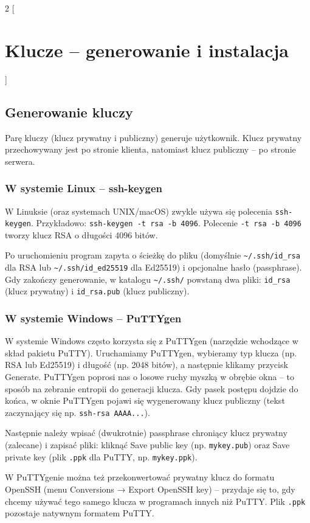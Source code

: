 \documentclass{article}
\begin{document}
\begin{multicols}{2}
[
\section{Klucze -- generowanie i instalacja}
]
\subsection{Generowanie kluczy}
Parę kluczy (klucz prywatny i publiczny) generuje użytkownik. Klucz prywatny przechowywany jest po stronie klienta, natomiast klucz publiczny -- po stronie serwera.

\subsubsection{W systemie Linux -- ssh-keygen}
W Linuksie (oraz systemach UNIX/macOS) zwykle używa się polecenia \verb|ssh-keygen|. Przykładowo:
\verb|ssh-keygen -t rsa -b 4096|. Polecenie \verb|-t rsa -b 4096| tworzy klucz RSA o długości 4096 bitów. 

Po uruchomieniu program zapyta o ścieżkę do pliku (domyślnie \verb|~/.ssh/id_rsa| dla RSA lub \verb|~/.ssh/id_ed25519| dla Ed25519) i opcjonalne hasło (passphrase). Gdy zakończy generowanie, w katalogu \verb|~/.ssh/| powstaną dwa pliki: \verb|id_rsa| (klucz prywatny) i \verb|id_rsa.pub| (klucz publiczny).

\subsubsection{W systemie Windows -- PuTTYgen}
W systemie Windows często korzysta się z PuTTYgen (narzędzie wchodzące w skład pakietu PuTTY). Uruchamiamy PuTTYgen, wybieramy typ klucza (np. RSA lub Ed25519) i długość (np. 2048 bitów), a następnie klikamy przycisk Generate. PuTTYgen poprosi nas o losowe ruchy myszką w obrębie okna -- to sposób na zebranie entropii do generacji klucza. Gdy pasek postępu dojdzie do końca, w oknie PuTTYgen pojawi się wygenerowany klucz publiczny (tekst zaczynający się np. \verb|ssh-rsa AAAA...|). 

Następnie należy wpisać (dwukrotnie) passphrase chroniący klucz prywatny (zalecane) i zapisać pliki: kliknąć Save public key (np. \verb|mykey.pub|) oraz Save private key (plik \verb|.ppk| dla PuTTY, np. \verb|mykey.ppk|).

W PuTTYgenie można też przekonwertować prywatny klucz do formatu OpenSSH (menu Conversions →
Export OpenSSH key) -- przydaje się to, gdy chcemy używać tego samego klucza w programach innych niż
PuTTY. Plik \verb|.ppk| pozostaje natywnym formatem PuTTY. 


\end{multicols}
\end{document}
